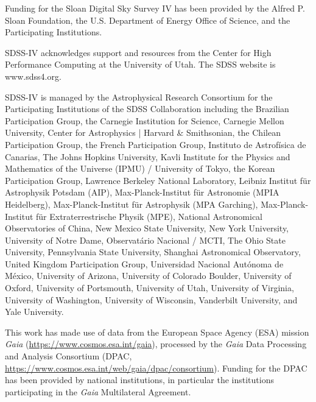 \documentclass[twocolumn,twocolappendix,linenumbers]{aastex631}
\begin{document}
\begin{acknowledgments}
    Funding for the Sloan Digital Sky 
    Survey IV has been provided by the 
    Alfred P. Sloan Foundation, the U.S. 
    Department of Energy Office of 
    Science, and the Participating 
    Institutions. 
    
    SDSS-IV acknowledges support and 
    resources from the Center for High 
    Performance Computing  at the 
    University of Utah. The SDSS 
    website is www.sdss4.org.
    
    SDSS-IV is managed by the 
    Astrophysical Research Consortium 
    for the Participating Institutions 
    of the SDSS Collaboration including 
    the Brazilian Participation Group, 
    the Carnegie Institution for Science, 
    Carnegie Mellon University, Center for 
    Astrophysics | Harvard \& 
    Smithsonian, the Chilean Participation 
    Group, the French Participation Group, 
    Instituto de Astrof\'isica de 
    Canarias, The Johns Hopkins 
    University, Kavli Institute for the 
    Physics and Mathematics of the 
    Universe (IPMU) / University of 
    Tokyo, the Korean Participation Group, 
    Lawrence Berkeley National Laboratory, 
    Leibniz Institut f\"ur Astrophysik 
    Potsdam (AIP),  Max-Planck-Institut 
    f\"ur Astronomie (MPIA Heidelberg), 
    Max-Planck-Institut f\"ur 
    Astrophysik (MPA Garching), 
    Max-Planck-Institut f\"ur 
    Extraterrestrische Physik (MPE), 
    National Astronomical Observatories of 
    China, New Mexico State University, 
    New York University, University of 
    Notre Dame, Observat\'ario 
    Nacional / MCTI, The Ohio State 
    University, Pennsylvania State 
    University, Shanghai 
    Astronomical Observatory, United 
    Kingdom Participation Group, 
    Universidad Nacional Aut\'onoma 
    de M\'exico, University of Arizona, 
    University of Colorado Boulder, 
    University of Oxford, University of 
    Portsmouth, University of Utah, 
    University of Virginia, University 
    of Washington, University of 
    Wisconsin, Vanderbilt University, 
    and Yale University.
    
    This work has made use of data from the European Space Agency (ESA) mission
    {\it Gaia} (\url{https://www.cosmos.esa.int/gaia}), processed by the {\it Gaia}
    Data Processing and Analysis Consortium (DPAC,
    \url{https://www.cosmos.esa.int/web/gaia/dpac/consortium}). Funding for the DPAC
    has been provided by national institutions, in particular the institutions
    participating in the {\it Gaia} Multilateral Agreement.

\end{acknowledgments}
\end{document}
